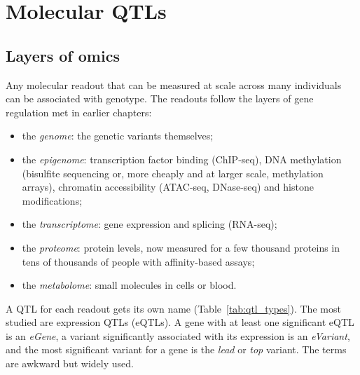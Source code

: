 \section{Molecular QTLs}

\subsection{Layers of omics}

Any molecular readout that can be measured at scale across many individuals can be associated with genotype. The readouts follow the layers of gene regulation met in earlier chapters:
\begin{itemize}
  \item the \emph{genome}: the genetic variants themselves;
  \item the \emph{epigenome}: transcription factor binding (ChIP-seq), DNA methylation (bisulfite sequencing or, more cheaply and at larger scale, methylation arrays), chromatin accessibility (ATAC-seq, DNase-seq) and histone modifications;
  \item the \emph{transcriptome}: gene expression and splicing (RNA-seq);
  \item the \emph{proteome}: protein levels, now measured for a few thousand proteins in tens of thousands of people with affinity-based assays;
  \item the \emph{metabolome}: small molecules in cells or blood.
\end{itemize}
A QTL for each readout gets its own name (Table~\ref{tab:qtl_types}). The most studied are expression QTLs (eQTLs). A gene with at least one significant eQTL is an \emph{eGene}, a variant significantly associated with its expression is an \emph{eVariant}, and the most significant variant for a gene is the \emph{lead} or \emph{top} variant. The terms are awkward but widely used.

